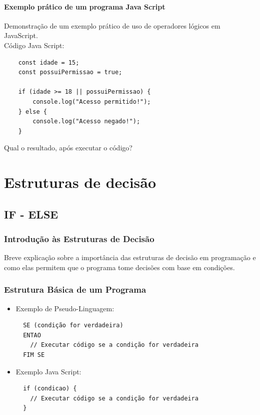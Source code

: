 \documentclass[13pt, xcolor={dvipsnames,svgnames}, portuguese]{beamer}
\begin{document}
\begin{frame}[fragile]
\framesubtitle{Exemplo prático de um programa Java Script}
 Demonstração de um exemplo prático de uso de operadores lógicos em JavaScript.\\
 Código Java Script:
	\begin{verbatim}
	const idade = 15;
    const possuiPermissao = true;

	if (idade >= 18 || possuiPermissao) {
  		console.log("Acesso permitido!");
	} else {
  		console.log("Acesso negado!");
	}
	\end{verbatim}	
	Qual o resultado, após executar o código?
\end{frame}

\section{Estruturas de decisão}
\subsection*{IF - ELSE}
\begin{frame}
  \frametitle{Introdução às Estruturas de Decisão}
  Breve explicação sobre a importância das estruturas de decisão em programação e como elas permitem que o programa tome decisões com base em condições.

\end{frame}

\begin{frame}[fragile]
  \frametitle{Estrutura Básica de um Programa}
  \begin{itemize}
    \item Exemplo de Pseudo-Linguagem:
    \begin{verbatim}
  SE (condição for verdadeira)
  ENTAO
    // Executar código se a condição for verdadeira
  FIM SE
    \end{verbatim}
  \end{itemize}
  
   \begin{itemize}
    \item Exemplo Java Script:
    \begin{verbatim}
  if (condicao) {
    // Executar código se a condição for verdadeira
  }
    \end{verbatim}
  \end{itemize}
\end{frame}
\end{document}
